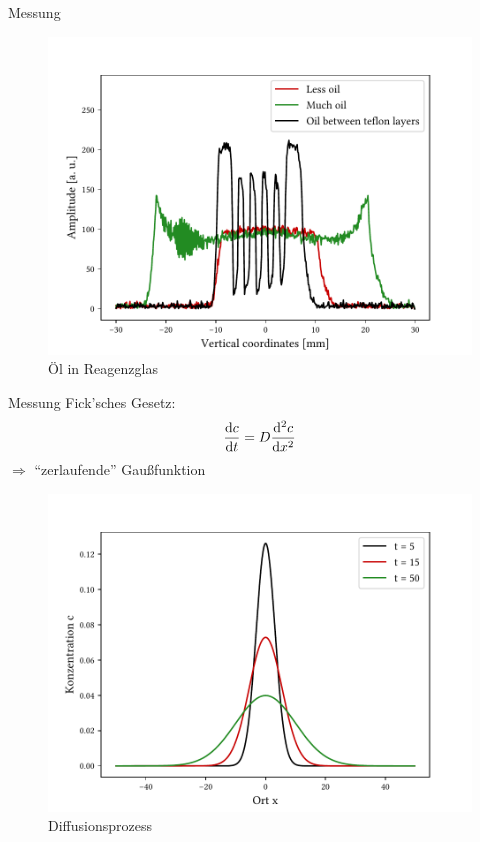 \begin{frame}{Messung}
	\begin{figure}
	\centering
	\includegraphics[scale=.55]{..//figures//f61_abb_8.pdf}
	\caption{Öl in Reagenzglas}
	\end{figure}
\end{frame}

\begin{frame}{Messung}
Fick'sches Gesetz:
	\begin{align*}
	\dv{c}{t}=D\dv[2]{c}{x}
	\end{align*}
	$\Rightarrow$ \enquote{zerlaufende} Gaußfunktion
	\begin{figure}
	\centering
	\includegraphics[scale=.4]{..//figures//gaus.pdf}
	\caption{Diffusionsprozess}
	\end{figure}
\end{frame}

